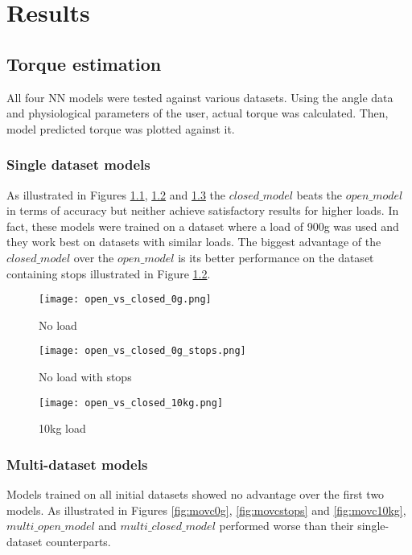 \chapter{Results}

\section{Torque estimation}
All four NN models were tested against various datasets. Using the angle data and 
physiological parameters of the user, actual torque was calculated. Then, model 
predicted torque was plotted against it.  

\subsection{Single dataset models}
As illustrated in Figures \ref{fig:ovc0g}, \ref{fig:ovc0gstops} and \ref{fig:ovc10kg} 
the $closed\_model$ beats the $open\_model$ in terms of accuracy but neither 
achieve satisfactory results for higher loads. In fact, these models were trained 
on a dataset where a load of 900g was used and they work best on datasets with 
similar loads. The biggest advantage of the $closed\_model$ over the $open\_model$ 
is its better performance on the dataset containing stops illustrated in Figure 
\ref{fig:ovc0gstops}.  
\begin{figure}[htbp]
  \centering
  \texttt{[image: open\_vs\_closed\_0g.png]}
  \caption{No load}
  \label{fig:ovc0g}
\end{figure}
\begin{figure}[htbp]
  \centering
  \texttt{[image: open\_vs\_closed\_0g\_stops.png]}
  \caption{No load with stops}
  \label{fig:ovc0gstops}
\end{figure}
\begin{figure}[htbp]
  \centering
  \texttt{[image: open\_vs\_closed\_10kg.png]}
  \caption{10kg load}
  \label{fig:ovc10kg}
\end{figure}
\FloatBarrier

\subsection{Multi-dataset models}
Models trained on all initial datasets showed no advantage over the first two 
models. As illustrated in Figures \ref{fig:movc0g}, \ref{fig:movcstops} and \ref{fig:movc10kg}, 
$multi\_open\_model$ and $multi\_closed\_model$ performed worse than their 
single-dataset counterparts.  

